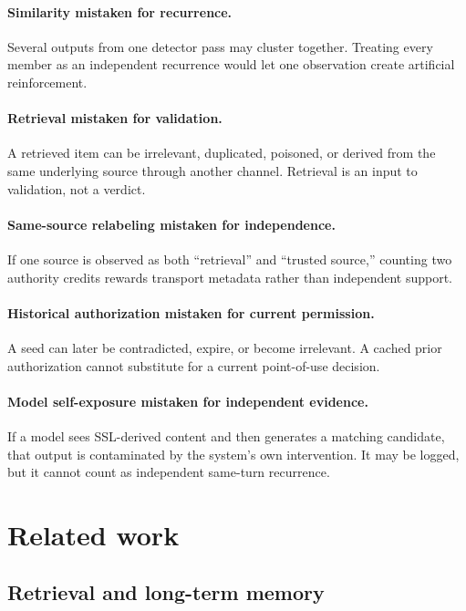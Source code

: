 \documentclass[11pt]{article}
\begin{document}
\paragraph{Similarity mistaken for recurrence.}
Several outputs from one detector pass may cluster together. Treating every member as an independent recurrence would let one observation create artificial reinforcement.

\paragraph{Retrieval mistaken for validation.}
A retrieved item can be irrelevant, duplicated, poisoned, or derived from the same underlying source through another channel. Retrieval is an input to validation, not a verdict.

\paragraph{Same-source relabeling mistaken for independence.}
If one source is observed as both ``retrieval'' and ``trusted source,'' counting two authority credits rewards transport metadata rather than independent support.

\paragraph{Historical authorization mistaken for current permission.}
A seed can later be contradicted, expire, or become irrelevant. A cached prior authorization cannot substitute for a current point-of-use decision.

\paragraph{Model self-exposure mistaken for independent evidence.}
If a model sees SSL-derived content and then generates a matching candidate, that output is contaminated by the system's own intervention. It may be logged, but it cannot count as independent same-turn recurrence.

\section{Related work}
\label{sec:related}

\subsection{Retrieval and long-term memory}
\end{document}
